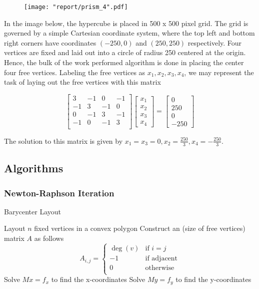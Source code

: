 \documentclass[11pt]{article}
\begin{document}
\begin{figure}[H]
    \texttt{[image: "report/prism\_4".pdf]}
\end{figure}

In the image below, the hypercube is placed in 500 x 500 pixel grid. The grid is governed by a simple Cartesian coordinate system, where the top left and bottom right corners have coordinates $(-250, 0)$ and $(250, 250)$ respectively. Four vertices are fixed and laid out into a circle of radius 250 centered at the origin. Hence, the bulk of the work performed algorithm is done in placing the center four free vertices. Labeling the free vertices as $x_1, x_2, x_3, x_4$, we may represent the task of laying out the free vertices with this matrix

\[
\begin{bmatrix}
    3 & -1 & 0 & -1 \\
    -1 & 3 & -1 & 0 \\
    0 & -1 & 3 & -1 \\
    -1 & 0 & -1 & 3 \\
\end{bmatrix}
\begin{bmatrix} x_1 \\ x_2 \\ x_3 \\ x_4 \end{bmatrix} =
\begin{bmatrix} 0 \\ 250 \\ 0 \\ -250 \end{bmatrix}
\]

The solution to this matrix is given by $x_1 = x_3 = 0, x_2 = \frac{250}{3}, x_4 = -\frac{250}{3}$.

\subsection{Algorithms}
\subsubsection{Newton-Raphson Iteration}
\begin{algorithm}
    \caption{Barycenter Layout}\label{euclid}
    \begin{algorithmic}[1]       
        \State Layout $n$ fixed vertices in a convex polygon
        \State Construct an (size of free vertices) matrix $A$ as follows
        \[
        A_{i, j} = \begin{cases}
        \deg(v) &{\text{if $i = j$}} \\
        -1      &{\text{if adjacent}} \\
        0       &{\text{otherwise}} \\
        \end{cases}
        \]
        \State Solve $Mx = f_x$ to find the x-coordinates
        \State Solve $My = f_y$ to find the y-coordinates
        \EndProcedure
    \end{algorithmic}
\end{algorithm}
\end{document}
